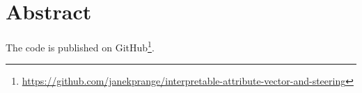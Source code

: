 %
\chapter*{Abstract}
\label{sec:abstract}
\vspace*{-10mm}

The code is published on GitHub\footnote{\url{https://github.com/janekprange/interpretable-attribute-vector-and-steering}}.




